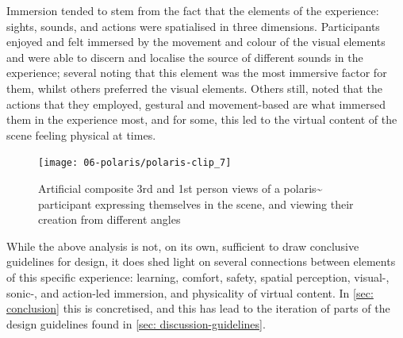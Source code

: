 Immersion tended to stem from the fact that the elements of the experience: sights, sounds, and actions were spatialised in three dimensions. Participants enjoyed and felt immersed by the movement and colour of the visual elements and were able to discern and localise the source of different sounds in the experience; several noting that this element was the most immersive factor for them, whilst others preferred the visual elements. Others still, noted that the actions that they employed, gestural and movement-based are what immersed them in the experience most, and for some, this led to the virtual content of the scene feeling physical at times.

\begin{figure}[ht]
    \centering
    \texttt{[image: 06-polaris/polaris-clip\_7]}
    \captionsetup{justification=centering,margin=1.5cm}
    \caption{Artificial composite 3rd and 1st person views of a polaris\textasciitilde{} participant expressing themselves in the scene, and viewing their creation from different angles \citep[from][\href{https://youtu.be/H8d3n7eNKAg}{at 0:00}]{bilbow2022}}\label{fig: polaris-clip_7}
\end{figure}    

While the above analysis is not, on its own, sufficient to draw conclusive guidelines for design, it does shed light on several connections between elements of this specific experience: learning, comfort, safety, spatial perception, visual-, sonic-, and action-led immersion, and physicality of virtual content. In \autoref{sec: conclusion} this is concretised, and this has lead to the iteration of parts of the design guidelines found in \autoref{sec: discussion-guidelines}.

